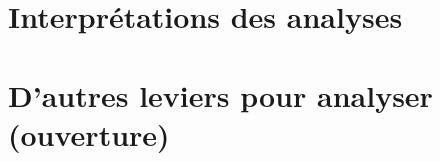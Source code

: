 \documentclass[
]{article}
\begin{document}
\hypertarget{interpruxe9tations-des-analyses}{%
\section{Interprétations des
analyses}\label{interpruxe9tations-des-analyses}}

\hypertarget{dautres-leviers-pour-analyser-ouverture}{%
\section{D'autres leviers pour analyser
(ouverture)}\label{dautres-leviers-pour-analyser-ouverture}}

\printbibliography[title=Conclusion]
\end{document}
